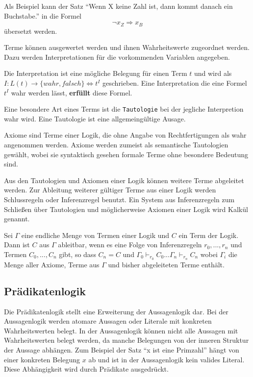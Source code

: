 Als Beispiel kann der Satz "`Wenn X keine Zahl ist, dann kommt danach ein
Buchstabe."' in die Formel
\[
  \neg x_{Z} \Rightarrow x_{B}
\]
übersetzt werden.

Terme können ausgewertet werden und ihnen Wahrheitswerte zugeordnet werden.
Dazu werden Interpretationen für die vorkommenden Variablen angegeben.

\begin{defi}
  Die Interpretation ist eine mögliche Belegung für einen Term $t$ und
  wird als $I:L(t)\rightarrow \{wahr,falsch\} \Leftrightarrow t^I$ geschrieben.
  Eine Interpretation die eine Formel $t^I$ wahr werden lässt, \textbf{erfüllt}
  diese Formel.
\end{defi}

Eine besondere Art eines Terms ist die \texttt{Tautologie} bei der jegliche
Interpretion wahr wird. Eine Tautologie ist eine allgemeingültige Ausage.

\begin{defi}
  Axiome sind Terme einer Logik, die ohne Angabe von Rechtfertigungen als wahr angenommen
  werden. Axiome werden zumeist als semantische Tautologien gewählt, wobei sie
  syntaktisch gesehen formale Terme ohne besondere Bedeutung sind.
\end{defi}

Aus den Tautologien und Axiomen einer Logik können weitere Terme abgeleitet
werden. Zur Ableitung weiterer gültiger Terme aus einer Logik werden
Schlussregeln oder Inferenzregel benutzt. Ein System aus Inferenzregeln zum
Schließen über Tautologien und möglicherweise Axiomen einer Logik wird Kalkül genannt.

\begin{defi}
  Sei $\Gamma$ eine endliche Menge von Termen einer Logik und $C$ ein Term der Logik.
  Dann ist $C$ aus $\Gamma$ ableitbar, wenn es eine Folge von Inferenzregeln
  $r_0,...,r_n$ und Termen $C_0,...,C_n$ gibt, so dass $C_n = C$ und
  $\Gamma_0\vdash_{r_0}C_0 ... \Gamma_n\vdash_{r_n}C_n$ wobei $\Gamma_i$ die Menge aller Axiome, Terme
  aus $\Gamma$ und bisher abgeleiteten Terme enthält.
\end{defi}

\subsection{Prädikatenlogik}
Die Prädikatenlogik stellt eine Erweiterung der Aussagenlogik dar.
Bei der Aussagenlogik werden atomare Aussagen oder Literale mit konkreten
Wahrheitswerten belegt. In der Aussagenlogik können nicht alle Aussagen
mit Wahrheitswerten belegt werden, da manche Belegungen von der inneren
Struktur der Aussage abhängen. Zum Beispiel der Satz "`x ist eine Primzahl"'
hängt von einer konkreten Belegung $x$ ab und ist in der Aussagenlogik kein
valides Literal. Diese Abhängigkeit wird durch Prädikate ausgedrückt.~\cite{heinemann2013logik}

